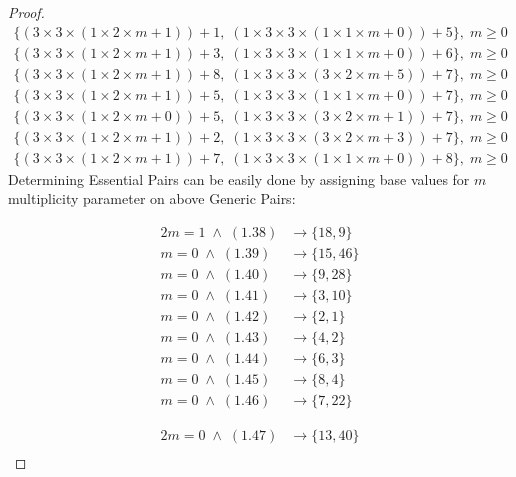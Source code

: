 \documentclass{jams-l}
\theoremstyle{definition}
\theoremstyle{remark}
\numberwithin{equation}{section}
\begin{document}
\begin{proof}
\begin{align}
    			\{(3\times3\times(1\times2\times m+1)) + 1,\;(1\times3\times3\times(1\times1\times m+0)) + 5\},\;m \geq 0\\
    			\{(3\times3\times(1\times2\times m+1)) + 3,\;(1\times3\times3\times(1\times1\times m+0)) + 6\},\;m \geq 0\\
    			\{(3\times3\times(1\times2\times m+1)) + 8,\;(1\times3\times3\times(3\times2\times m+5)) + 7\},\;m \geq 0
       		\end{align}
    		\begin{align}
                \{(3\times3\times(1\times2\times m+1)) + 5,\;(1\times3\times3\times(1\times1\times m+0)) + 7\},\;m \geq 0\\
    			\{(3\times3\times(1\times2\times m+0)) + 5,\;(1\times3\times3\times(3\times2\times m+1)) + 7\},\;m \geq 0\\
    			\{(3\times3\times(1\times2\times m+1)) + 2,\;(1\times3\times3\times(3\times2\times m+3)) + 7\},\;m \geq 0\\
    			\{(3\times3\times(1\times2\times m+1)) + 7,\;(1\times3\times3\times(1\times1\times m+0)) + 8\},\;m \geq 0
    		\end{align}
    		Determining Essential Pairs can be easily done by assigning base values for $m$ multiplicity parameter on above Generic Pairs:\\
    		\begin{minipage}[b]{.47\textwidth}
    			\begin{alignat}{2}
    				m = 1\;\land\;(1.38) &\rightarrow \{18, 9\}\\
    				m = 0\;\land\;(1.39) &\rightarrow \{15, 46\}\\
    				m = 0\;\land\;(1.40) &\rightarrow \{9, 28\}\\
    				m = 0\;\land\;(1.41) &\rightarrow \{3, 10\}\\
    				m = 0\;\land\;(1.42) &\rightarrow \{2, 1\}\\
    				m = 0\;\land\;(1.43) &\rightarrow \{4, 2\}\\
    				m = 0\;\land\;(1.44) &\rightarrow \{6, 3\}\\
    				m = 0\;\land\;(1.45) &\rightarrow \{8, 4\}\\
    				m = 0\;\land\;(1.46) &\rightarrow \{7, 22\}
    			\end{alignat}
    		\end{minipage}
    		\quad
    		\begin{minipage}[b]{.47\textwidth}
    			\begin{alignat}{2}
    				m = 0\;\land\;(1.47) &\rightarrow \{13, 40\}\\

\end{alignat}
\end{minipage}
\end{proof}
\end{document}
